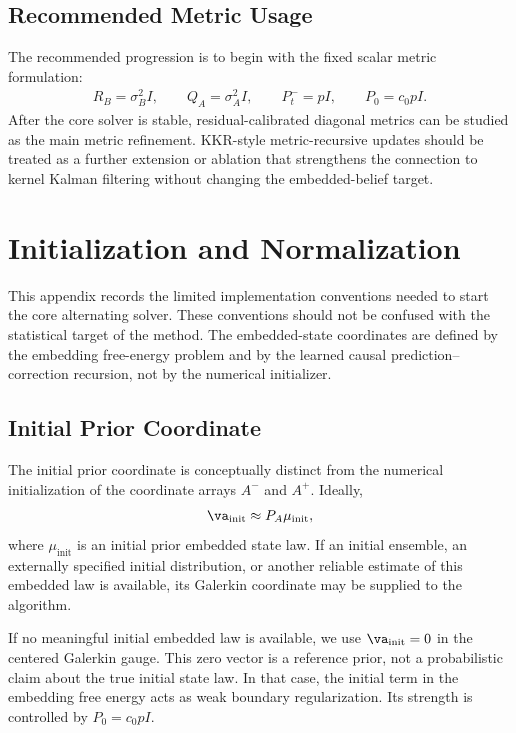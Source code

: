 \documentclass[twoside,11pt]{article}
\begin{document}
\subsection{Recommended Metric Usage}

The recommended progression is to begin with the fixed scalar metric
formulation:
\begin{align}
R_B=\sigma_B^2 I,
\qquad
Q_A=\sigma_A^2 I,
\qquad
P_t^-=pI,
\qquad
P_0=c_0pI.
\end{align}
After the core solver is stable, residual-calibrated diagonal metrics
can be studied as the main metric refinement. KKR-style
metric-recursive updates should be treated as a further extension or
ablation that strengthens the connection to kernel Kalman filtering
without changing the embedded-belief target.


\section{Initialization and Normalization}
\label{app:initialization_normalization}

This appendix records the limited implementation conventions needed to
start the core alternating solver. These conventions should not be
confused with the statistical target of the method. The embedded-state
coordinates are defined by the embedding free-energy problem and by the
learned causal prediction--correction recursion, not by the numerical
initializer.

\subsection{Initial Prior Coordinate}

The initial prior coordinate is conceptually distinct from the numerical
initialization of the coordinate arrays $A^-$ and $A^+$. Ideally,
\begin{align}
\va_{\mathrm{init}}
\approx
P_A\mu_{\mathrm{init}},
\label{eq:app_initial_prior_coordinate}
\end{align}
where $\mu_{\mathrm{init}}$ is an initial prior embedded state law. If an
initial ensemble, an externally specified initial distribution, or
another reliable estimate of this embedded law is available, its
Galerkin coordinate may be supplied to the algorithm.

If no meaningful initial embedded law is available, we use
$\va_{\mathrm{init}}=0$ in the centered Galerkin gauge. This zero vector
is a reference prior, not a probabilistic claim about the true initial
state law. In that case, the initial term in the embedding free energy
acts as weak boundary regularization. Its strength is controlled by
$P_0=c_0pI$.
\end{document}
